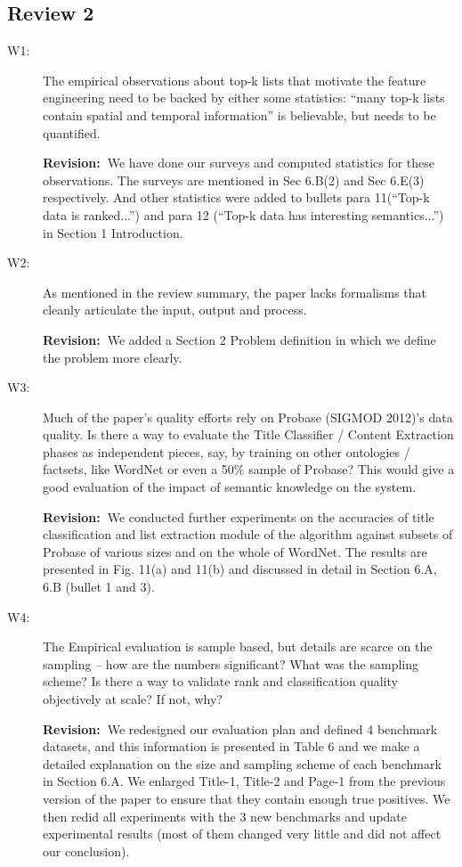 \documentclass[11pt]{article}
\newcommand{\rv}{\textbf{Revision:~}}
\begin{document}
\subsection*{Review 2}
\begin{description}
\item[W1:]
The empirical observations about top-k lists that motivate the feature
engineering need to be backed by either some statistics: ``many top-k lists
contain spatial and temporal information'' is believable, but needs to be
quantified.

\rv We have done our surveys and computed statistics for
these observations. The surveys are mentioned in Sec 6.B(2) and Sec
6.E(3) respectively. And other statistics were added to bullets
para 11(``Top-k data is ranked...'') and para 12 (``Top-k data has
interesting semantics...'') in Section 1 Introduction.

\item[W2:] As mentioned in the review summary, the paper lacks formalisms that
cleanly articulate the input, output and process.

\rv We added a Section 2 Problem definition in which we define the
problem more clearly.

\item[W3:] Much of the paper's quality efforts rely on Probase (SIGMOD 2012)'s data
quality. Is there a way to evaluate the Title Classifier / Content
Extraction phases as independent pieces, say, by training on other
ontologies / factsets, like WordNet or even a 50\% sample of Probase? This
would give a good evaluation of the impact of semantic knowledge on the
system.

\rv We conducted further experiments on the accuracies of
title classification and list extraction module of the algorithm
against subsets of Probase of various sizes and on the
whole of WordNet. The results are presented in Fig. 11(a) and 11(b)
and discussed in detail in Section 6.A, 6.B (bullet 1 and 3).

\item[W4:] The Empirical evaluation is sample based, but details are scarce on the
sampling -- how are the numbers significant? What was the sampling scheme?
Is there a way to validate rank and classification quality objectively at
scale? If not, why?

\rv We redesigned our evaluation plan and defined 4 benchmark
datasets, and this information is presented in Table 6 and we make a detailed
explanation on the size and sampling scheme of each benchmark in
Section 6.A. We enlarged Title-1, Title-2 and Page-1 from the previous version of
the paper to ensure that they contain enough true positives. We then redid
all experiments with the 3 new benchmarks and update experimental results
(most of them changed very little and did not affect our conclusion).


\end{description}
\end{document}
